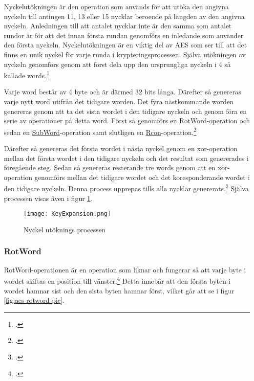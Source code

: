 Nyckelutökningen är den operation som används för att utöka den angivna nyckeln till antingen 11, 13 eller 15 nycklar beroende på längden av den angivna nyckeln.
Anledningen till att antalet nycklar inte är den samma som antalet rundor är för att det innan första rundan genomförs en inledande  som använder den första nyckeln.
Nyckelutökningen är en viktig del av AES som ser till att det finns en unik nyckel för varje runda i krypteringsprocessen.
Själva utökningen av nyckeln genomförs genom att först dela upp den ursprungliga nyckeln i 4 så kallade words.\footcite{daemen1999aes}

Varje word består av 4 \gls{byte} och är därmed 32 \gls{bit}s långa.
Därefter så genereras varje nytt word utifrån det tidigare worden. Det fyra nästkommande worden genereras genom att ta det sista wordet i den tidigare nyckeln och genom föra en serie av operationer
på detta word. Först så genomförs en \hyperref[sec:aes-rotword]{RotWord}-operation och sedan en \hyperref[sec:aes-subword]{SubWord}-operation samt slutligen en \hyperref[sec:aes-rcon]{Rcon}-operation.\footcite{daemen1999aes}

Därefter så genereras det första wordet i nästa nyckel genom en \gls{xor}-operation mellan det första wordet i den tidigare nyckeln och det resultat som genererades i föregående steg.
Sedan så genereras resterande tre words genom att en \gls{xor}-operation genomförs mellan det tidigare wordet och det koresponderande wordet i den tidigare nyckeln.
Denna process upprepas tills alla nycklar genererats.\footcite{daemen1999aes} Själva processen visas även i figur \ref{fig:aes-key-expansion-pic}.

\begin{figure}[H]
    \centering
    \texttt{[image: KeyExpansion.png]}
    \caption{Nyckel utöknings processen}
    \label{fig:aes-key-expansion-pic}
\end{figure}

\subsubsection{RotWord}
\label{sec:aes-rotword}

RotWord-operationen är en operation som liknar  och fungerar så att varje \gls{byte} i wordet skiftas en position till vänster.\footcite{daemen1999aes}
Detta innebär att den första \gls{byte}n i wordet hamnar sist och den sista \gls{byte}n hamnar först, vilket går att se i figur \ref{fig:aes-rotword-pic}.


